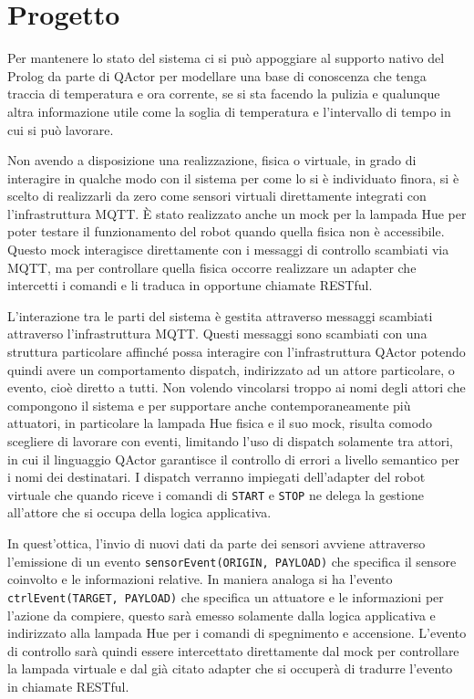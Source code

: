 \section{Progetto}
Per mantenere lo stato del sistema ci si può appoggiare al supporto nativo del Prolog da parte di QActor per modellare una base di conoscenza che tenga traccia di temperatura e ora corrente, se si sta facendo la pulizia e qualunque altra informazione utile come la soglia di temperatura e l'intervallo di tempo in cui si può lavorare.

Non avendo a disposizione una realizzazione, fisica o virtuale, in grado di interagire in qualche modo con il sistema per come lo si è individuato finora, si è scelto di realizzarli da zero come sensori virtuali direttamente integrati con l'infrastruttura MQTT. È stato realizzato anche un mock per la lampada Hue per poter testare il funzionamento del robot quando quella fisica non è accessibile. Questo mock interagisce direttamente con i messaggi di controllo scambiati via MQTT, ma per controllare quella fisica occorre realizzare un adapter che intercetti i comandi e li traduca in opportune chiamate RESTful.

L'interazione tra le parti del sistema è gestita attraverso messaggi scambiati attraverso l'infrastruttura MQTT. Questi messaggi sono scambiati con una struttura particolare affinché possa interagire con l'infrastruttura QActor potendo quindi avere un comportamento dispatch, indirizzato ad un attore particolare, o evento, cioè diretto a tutti. Non volendo vincolarsi troppo ai nomi degli attori che compongono il sistema e per supportare anche contemporaneamente più attuatori, in particolare la lampada Hue fisica e il suo mock, risulta comodo scegliere di lavorare con eventi, limitando l'uso di dispatch solamente tra attori, in cui il linguaggio QActor garantisce il controllo di errori a livello semantico per i nomi dei destinatari. I dispatch verranno impiegati dell'adapter del robot virtuale che quando riceve i comandi di \texttt{START} e \texttt{STOP} ne delega la gestione all'attore che si occupa della logica applicativa.

In quest'ottica, l'invio di nuovi dati da parte dei sensori avviene attraverso l'emissione di un evento \texttt{sensorEvent(ORIGIN, PAYLOAD)} che specifica il sensore coinvolto e le informazioni relative. In maniera analoga si ha l'evento \texttt{ctrlEvent(TARGET, PAYLOAD)} che specifica un attuatore e le informazioni per l'azione da compiere, questo sarà emesso solamente dalla logica applicativa e indirizzato alla lampada Hue per i comandi di spegnimento e accensione. L'evento di controllo sarà quindi essere intercettato direttamente dal mock per controllare la lampada virtuale e dal già citato adapter che si occuperà di tradurre l'evento in chiamate RESTful.


